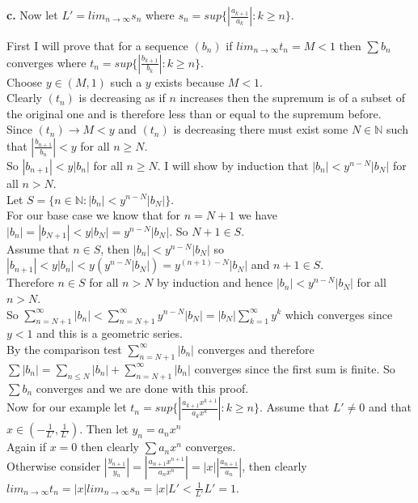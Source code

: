 \documentclass{article}
\begin{document}
{\Large\textbf{c.}} Now let $L' = lim_{n\rightarrow\infty} s_n$ where $s_n = sup\{|\frac{a_{k+1}}{a_k}| : k\geq n\}$.
\begin{center}
    \doublespacing
    First I will prove that for a sequence $(b_n)$ if $lim_{n\rightarrow\infty} t_n = M < 1$ then $\sum b_n$ converges where $t_n = sup\{|\frac{b_{k+1}}{b_k}| : k\geq n\}$.
    \\Choose $y\in (M, 1)$ such a $y$ exists because $M < 1$.
    \\Clearly $(t_n)$ is decreasing as if $n$ increases then the supremum is of a subset of the original one and is therefore less than or equal to the supremum before.
    \\Since $(t_n)\rightarrow M < y$ and $(t_n)$ is decreasing there must exist some $N\in\mathbb{N}$ such that $|\frac{b_{n+1}}{b_n}| < y$ for all $n\geq N$.
    \\So $|b_{n+1}| < y|b_n|$ for all $n\geq N$. I will show by induction that $|b_n| < y^{n - N} |b_N|$ for all $n > N$.
    \\Let $S =\{n\in\mathbb{N} : |b_n| < y^{n - N} |b_N|\}$.
    \\For our base case we know that for $n = N + 1$ we have $|b_n| = |b_{N+1}| < y|b_N| = y^{n-N} |b_N|$. So $N+1\in S$.
    \\Assume that $n\in S$, then $|b_n| < y^{n-N} |b_N|$ so $|b_{n+1}| < y |b_n| < y (y^{n-N} |b_N|) = y^{(n+1) - N} |b_N|$ and $n+1\in S$.
    \\Therefore $n\in S$ for all $n > N$ by induction and hence $|b_n| < y^{n - N} |b_N|$ for all $n > N$.
    \\So $\sum _{n = N+1}^{\infty} |b_n| <\sum _{n = N+1}^{\infty} y^{n-N} |b_N| = |b_N|\sum _{k=1}^{\infty} y^k$ which converges since $y < 1$ and this is a geometric series.
    \\By the comparison test $\sum _{n = N+1}^{\infty} |b_n|$ converges and therefore $\sum |b_n| =\sum _{n\leq N} |b_n| +\sum _{n = N+1}^{\infty} |b_n|$ converges since the first sum is finite. So $\sum b_n$ converges and we are done with this proof.
    \\Now for our example let $t_n = sup\{|\frac{a_{k+1} x^{k+1}}{a_k x^k}| : k\geq n\}$. Assume that $L'\neq 0$ and that $x\in (-\frac{1}{L'},\frac{1}{L'})$. Then let $y_n = a_n x^n$
    \\Again if $x = 0$ then clearly $\sum a_n x^n$ converges.
    \\Otherwise consider $|\frac{y_{n+1}}{y_n}| = |\frac{a_{n+1} x^{n+1}}{a_n x^n}| = |x||\frac{a_{n+1}}{a_n}|$, then clearly $lim_{n\rightarrow\infty} t_n = |x| lim_{n\rightarrow\infty} s_n = |x| L' <\frac{1}{L'} L' = 1$.

\end{center}
\end{document}
